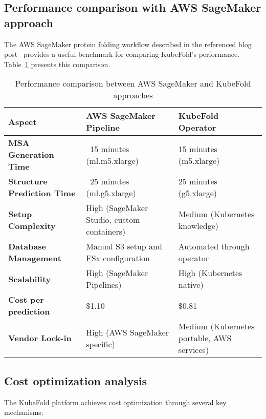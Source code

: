 \subsection{Performance comparison with AWS SageMaker approach}

The AWS SageMaker protein folding workflow described in the referenced blog post~\cite{aws-sagemaker-protein-folding} provides a useful benchmark for comparing KubeFold's performance. Table~\ref{tab:sagemaker_comparison} presents this comparison.

\begin{table}[H]
    \centering
    \small
    \begin{tabularx}{\textwidth}{|X|X|X|}
        \hline
        \textbf{Aspect} & \textbf{AWS SageMaker Pipeline} & \textbf{KubeFold Operator} \\
        \hline
        \textbf{MSA Generation Time} & ~15 minutes (ml.m5.xlarge) & 15 minutes (m5.xlarge) \\
        \hline
        \textbf{Structure Prediction Time} & ~25 minutes (ml.g5.xlarge) & 25 minutes (g5.xlarge) \\
        \hline
        \textbf{Setup Complexity} & High (SageMaker Studio, custom containers) & Medium (Kubernetes knowledge) \\
        \hline
        \textbf{Database Management} & Manual S3 setup and FSx configuration & Automated through operator \\
        \hline
        \textbf{Scalability} & High (SageMaker Pipelines) & High (Kubernetes native) \\
        \hline
        \textbf{Cost per prediction} & \$1.10 & \$0.81 \\
        \hline
        \textbf{Vendor Lock-in} & High (AWS SageMaker specific) & Medium (Kubernetes portable, AWS services) \\
        \hline
    \end{tabularx}
    \caption{Performance comparison between AWS SageMaker and KubeFold approaches}
    \label{tab:sagemaker_comparison}
\end{table}

\subsection{Cost optimization analysis}

The KubeFold platform achieves cost optimization through several key mechanisms:

